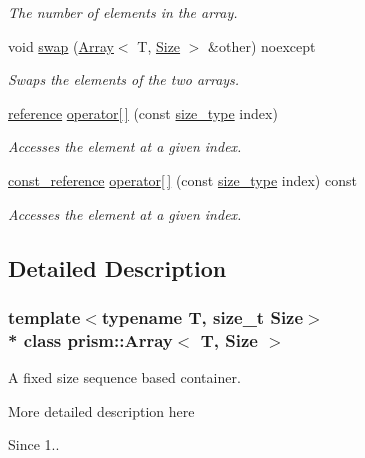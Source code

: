 \begin{DoxyCompactItemize}
\begin{DoxyCompactList}\small\item\em The number of elements in the array. \end{DoxyCompactList}\item 
void \hyperlink{classprism_1_1_array_a2a1fcb058f5c434c92d57c33a3f552d7}{swap} (\hyperlink{classprism_1_1_array}{Array}$<$ T, \hyperlink{classprism_1_1_size}{Size} $>$ \&other) noexcept
\begin{DoxyCompactList}\small\item\em Swaps the elements of the two arrays. \end{DoxyCompactList}\item 
\hyperlink{classprism_1_1_array_a00d78e61fb0a47489aff55b88ae9ebaa}{reference} \hyperlink{classprism_1_1_array_a36d5df6e36bc5744202e08721b27a009}{operator\mbox{[}$\,$\mbox{]}} (const \hyperlink{classprism_1_1_array_a91c89205e41d0e7825562343bfde3f1b}{size\+\_\+type} index)
\begin{DoxyCompactList}\small\item\em Accesses the element at a given index. \end{DoxyCompactList}\item 
\hyperlink{classprism_1_1_array_a16161ca6c0027dfa1a7c678e820eedc3}{const\+\_\+reference} \hyperlink{classprism_1_1_array_a7afed59b3c1f6f621dd01131ce370539}{operator\mbox{[}$\,$\mbox{]}} (const \hyperlink{classprism_1_1_array_a91c89205e41d0e7825562343bfde3f1b}{size\+\_\+type} index) const 
\begin{DoxyCompactList}\small\item\em Accesses the element at a given index. \end{DoxyCompactList}\end{DoxyCompactItemize}


\subsection{Detailed Description}
\subsubsection*{template$<$typename T, size\+\_\+t Size$>$\\*
class prism\+::\+Array$<$ T, Size $>$}

A fixed size sequence based container. 

More detailed description here

\begin{DoxySince}{Since}
1.. 
\end{DoxySince}


